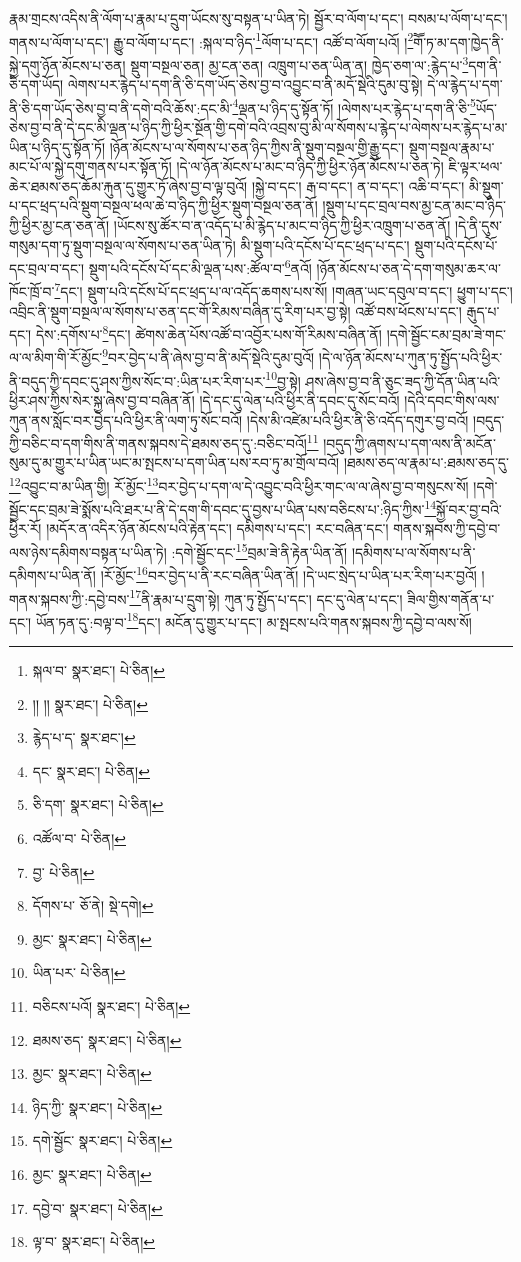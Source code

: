རྣམ་གྲངས་འདིས་ནི་ལོག་པ་རྣམ་པ་དྲུག་ཡོངས་སུ་བསྟན་པ་ཡིན་ཏེ། སྦྱོར་བ་ལོག་པ་དང་། བསམ་པ་ལོག་པ་དང་། གནས་པ་ལོག་པ་དང་། རྒྱུ་བ་ལོག་པ་དང་། :སྐལ་བ་ཉིད་\footnote{སྐལ་བ་  སྣར་ཐང་།  པེ་ཅིན། }ལོག་པ་དང་། འཚོ་བ་ལོག་པའོ། །\footnote{།། །།  སྣར་ཐང་།  པེ་ཅིན། }གཽ་ཏ་མ་དག་ཁྱེད་ནི་སྐྱེ་དགུ་ཉོན་མོངས་པ་ཅན། སྡུག་བསྔལ་ཅན། མྱ་ངན་ཅན། འཁྲུག་པ་ཅན་ཡིན་ན། ཁྱེད་ཅག་ལ་:རྙེད་པ་\footnote{རྙེད་པ་ད་  སྣར་ཐང་། }དག་ནི་ཅི་དག་ཡོད། ལེགས་པར་རྙེད་པ་དག་ནི་ཅི་དག་ཡོད་ཅེས་བྱ་བ་འབྱུང་བ་ནི་མདོ་སྡེའི་དུམ་བུ་སྟེ། དེ་ལ་རྙེད་པ་དག་ནི་ཅི་དག་ཡོད་ཅེས་བྱ་བ་ནི་དགེ་བའི་ཆོས་:དང་མི་\footnote{དང་  སྣར་ཐང་།  པེ་ཅིན། }ལྡན་པ་ཉིད་དུ་སྟོན་ཏོ། །ལེགས་པར་རྙེད་པ་དག་ནི་ཅི་\footnote{ཅི་དག་  སྣར་ཐང་།  པེ་ཅིན། }ཡོད་ཅེས་བྱ་བ་ནི་དེ་དང་མི་ལྡན་པ་ཉིད་ཀྱི་ཕྱིར་སྔོན་གྱི་དགེ་བའི་འབྲས་བུ་མི་ལ་སོགས་པ་རྙེད་པ་ལེགས་པར་རྙེད་པ་མ་ཡིན་པ་ཉིད་དུ་སྟོན་ཏོ། །ཉོན་མོངས་པ་ལ་སོགས་པ་ཅན་ཉིད་ཀྱིས་ནི་སྡུག་བསྔལ་གྱི་རྒྱུ་དང་། སྡུག་བསྔལ་རྣམ་པ་མང་པོ་ལ་སྐྱེ་དགུ་གནས་པར་སྟོན་ཏོ། །དེ་ལ་ཉོན་མོངས་པ་མང་བ་ཉིད་ཀྱི་ཕྱིར་ཉོན་མོངས་པ་ཅན་ཏེ། ཇི་ལྟར་ཕལ་ཆེར་ཐམས་ཅད་ཆོམ་རྐུན་དུ་གྱུར་ཏོ་ཞེས་བྱ་བ་ལྟ་བུའོ། །སྐྱེ་བ་དང་། རྒ་བ་དང་། ན་བ་དང་། འཆི་བ་དང་། མི་སྡུག་པ་དང་ཕྲད་པའི་སྡུག་བསྔལ་ཕལ་ཆེ་བ་ཉིད་ཀྱི་ཕྱིར་སྡུག་བསྔལ་ཅན་ནོ། །སྡུག་པ་དང་བྲལ་བས་མྱ་ངན་མང་བ་ཉིད་ཀྱི་ཕྱིར་མྱ་ངན་ཅན་ནོ། །ཡོངས་སུ་ཚོར་བ་ན་འདོད་པ་མི་རྙེད་པ་མང་བ་ཉིད་ཀྱི་ཕྱིར་འཁྲུག་པ་ཅན་ནོ། །དེ་ནི་དུས་གསུམ་དག་ཏུ་སྡུག་བསྔལ་ལ་སོགས་པ་ཅན་ཡིན་ཏེ། མི་སྡུག་པའི་དངོས་པོ་དང་ཕྲད་པ་དང་། སྡུག་པའི་དངོས་པོ་དང་བྲལ་བ་དང་། སྡུག་པའི་དངོས་པོ་དང་མི་ལྡན་པས་:ཚོལ་བ་\footnote{འཚོལ་བ་  པེ་ཅིན། }ནའོ། །ཉོན་མོངས་པ་ཅན་དེ་དག་གསུམ་ཆར་ལ་ཁོང་ཁྲོ་བ་\footnote{བྱ་  པེ་ཅིན། }དང་། སྡུག་པའི་དངོས་པོ་དང་ཕྲད་པ་ལ་འདོད་ཆགས་པས་སོ། །གཞན་ཡང་དབུལ་བ་དང་། ཕྱུག་པ་དང་། འབྲིང་ནི་སྡུག་བསྔལ་ལ་སོགས་པ་ཅན་དང་གོ་རིམས་བཞིན་དུ་རིག་པར་བྱ་སྟེ། འཚོ་བས་ཕོངས་པ་དང་། རྒུད་པ་དང་། དེས་:དགོས་པ་\footnote{དོགས་པ་  ཅོ་ནེ།  སྡེ་དགེ། }དང་། ཚེགས་ཆེན་པོས་འཚོ་བ་འབྱོར་པས་གོ་རིམས་བཞིན་ནོ། །དགེ་སྦྱོང་ངམ་བྲམ་ཟེ་གང་ལ་ལ་མིག་གི་རོ་མྱོང་\footnote{མྱང་  སྣར་ཐང་།  པེ་ཅིན། }བར་བྱེད་པ་ནི་ཞེས་བྱ་བ་ནི་མདོ་སྡེའི་དུམ་བུའོ། །དེ་ལ་ཉོན་མོངས་པ་ཀུན་ཏུ་སྤྱོད་པའི་ཕྱིར་ནི་བདུད་ཀྱི་དབང་དུ་ཤས་ཀྱིས་སོང་བ་:ཡིན་པར་རིག་པར་\footnote{ཡིན་པར་  པེ་ཅིན། }བྱ་སྟེ། ཤས་ཞེས་བྱ་བ་ནི་ཅུང་ཟད་ཀྱི་དོན་ཡིན་པའི་ཕྱིར་ཤས་ཀྱིས་སེར་སྐྱ་ཞེས་བྱ་བ་བཞིན་ནོ། །དེ་དང་དུ་ལེན་པའི་ཕྱིར་ནི་དབང་དུ་སོང་བའོ། །དེའི་དབང་གིས་ལས་ཀུན་ནས་སློང་བར་བྱེད་པའི་ཕྱིར་ནི་ལག་ཏུ་སོང་བའོ། །དེས་མི་འཛེམ་པའི་ཕྱིར་ནི་ཅི་འདོད་དགུར་བྱ་བའོ། །བདུད་ཀྱི་བཅིང་བ་དག་གིས་ནི་གནས་སྐབས་དེ་ཐམས་ཅད་དུ་:བཅིང་བའོ།\footnote{བཅིངས་པའོ།  སྣར་ཐང་།  པེ་ཅིན། } །བདུད་ཀྱི་ཞགས་པ་དག་ལས་ནི་མངོན་སུམ་དུ་མ་གྱུར་པ་ཡིན་ཡང་མ་སྤངས་པ་དག་ཡིན་པས་རབ་ཏུ་མ་གྲོལ་བའོ། །ཐམས་ཅད་ལ་རྣམ་པ་:ཐམས་ཅད་དུ་\footnote{ཐམས་ཅད་  སྣར་ཐང་།  པེ་ཅིན། }འབྱུང་བ་མ་ཡིན་གྱི། རོ་མྱོང་\footnote{མྱང་  སྣར་ཐང་།  པེ་ཅིན། }བར་བྱེད་པ་དག་ལ་དེ་འབྱུང་བའི་ཕྱིར་གང་ལ་ལ་ཞེས་བྱ་བ་གསུངས་སོ། །དགེ་སྦྱོང་དང་བྲམ་ཟེ་སྨོས་པའི་ཐར་པ་ནི་དེ་དག་གི་དབང་དུ་བྱས་པ་ཡིན་པས་བཅིངས་པ་:ཉིད་ཀྱིས་\footnote{ཉིད་ཀྱི་  སྣར་ཐང་།  པེ་ཅིན། }སྐྱོ་བར་བྱ་བའི་ཕྱིར་རོ། །མདོར་ན་འདིར་ཉོན་མོངས་པའི་རྟེན་དང་། དམིགས་པ་དང་། རང་བཞིན་དང་། གནས་སྐབས་ཀྱི་དབྱེ་བ་ལས་ཉེས་དམིགས་བསྟན་པ་ཡིན་ཏེ། :དགེ་སྦྱོང་དང་\footnote{དགེ་སྦྱོང་  སྣར་ཐང་།  པེ་ཅིན། }བྲམ་ཟེ་ནི་རྟེན་ཡིན་ནོ། །དམིགས་པ་ལ་སོགས་པ་ནི་དམིགས་པ་ཡིན་ནོ། །རོ་མྱོང་\footnote{མྱང་  སྣར་ཐང་།  པེ་ཅིན། }བར་བྱེད་པ་ནི་རང་བཞིན་ཡིན་ནོ། །དེ་ཡང་སྲེད་པ་ཡིན་པར་རིག་པར་བྱའོ། །གནས་སྐབས་ཀྱི་:དབྱེ་བས་\footnote{དབྱེ་བ་  སྣར་ཐང་།  པེ་ཅིན། }ནི་རྣམ་པ་དྲུག་སྟེ། ཀུན་ཏུ་སྤྱོད་པ་དང་། དང་དུ་ལེན་པ་དང་། ཟིལ་གྱིས་གནོན་པ་དང་། ཡོན་ཏན་དུ་:བལྟ་བ་\footnote{ལྟ་བ་  སྣར་ཐང་།  པེ་ཅིན། }དང་། མངོན་དུ་གྱུར་པ་དང་། མ་སྤངས་པའི་གནས་སྐབས་ཀྱི་དབྱེ་བ་ལས་སོ། 